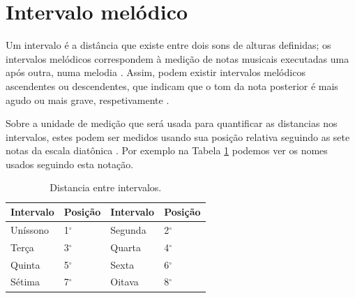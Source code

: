 
\section{Intervalo melódico}
\label{sec:intervalomelodico}


Um intervalo é a distância que existe entre dois sons de alturas definidas;
os intervalos melódicos correspondem à medição de notas musicais executadas uma após outra, 
numa melodia \cite[pp. 17]{holst1998abc}.
Assim, podem existir intervalos melódicos ascendentes ou descendentes,
que indicam que o tom da nota posterior é mais agudo ou mais grave, respetivamente \cite[pp. 17]{holst1998abc}.

Sobre a unidade de medição que será usada para quantificar as distancias nos intervalos, 
estes podem ser medidos usando sua posição relativa seguindo as sete notas da escala diatônica \cite[pp. 17]{holst1998abc}.
Por exemplo na Tabela \ref{tab:intervalomelodico} podemos ver os nomes usados seguindo esta notação.  
\begin{table}[h]
  \centering
  \begin{tabular}{|l|l||l|l|}
  \hline
  Intervalo & Posição     & Intervalo & Posição \\ \hline \hline
  Uníssono  & 1$^{\circ}$ & Segunda   & 2$^{\circ}$ \\ \hline
  Terça     & 3$^{\circ}$ & Quarta    & 4$^{\circ}$ \\ \hline
  Quinta    & 5$^{\circ}$ & Sexta     & 6$^{\circ}$ \\ \hline
  Sétima    & 7$^{\circ}$ & Oitava    & 8$^{\circ}$ \\ \hline
  \end{tabular}
  \caption{Distancia entre intervalos.}
  \label{tab:intervalomelodico}
\end{table}

